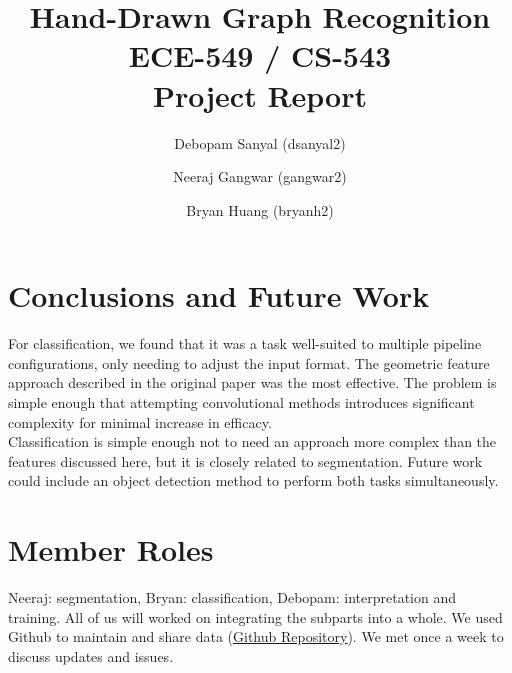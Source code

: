 \documentclass[10pt, twocolumn,letterpaper]{article}
\title{Hand-Drawn Graph Recognition\\
	ECE-549 / CS-543\\
	Project Report}
\author{Debopam Sanyal (dsanyal2) \and Neeraj Gangwar (gangwar2) \and Bryan Huang (bryanh2)}
\begin{document}
	\maketitle
	
	
	
	
	
	
	
	
	
	\section{Conclusions and Future Work}
	
	For classification, we found that it was a task well-suited to multiple pipeline configurations, only needing to adjust the input format. The geometric feature approach described in the original paper was the most effective. The problem is simple enough that attempting convolutional methods introduces significant complexity for minimal increase in efficacy.\\
    
    Classification is simple enough not to need an approach more complex than the features discussed here, but it is closely related to segmentation. Future work could include an object detection method to perform both tasks simultaneously.
	
	\section{Member Roles}
	Neeraj: segmentation, Bryan: classification, Debopam: interpretation and training. All of us will worked on integrating the subparts into a whole. We used Github to maintain and share data (\href{https://github.com/neerajgangwar/graph-recognition}{Github Repository}). We met once a week to discuss updates and issues.
	
	\printbibliography[title=References]
	
\end{document}
